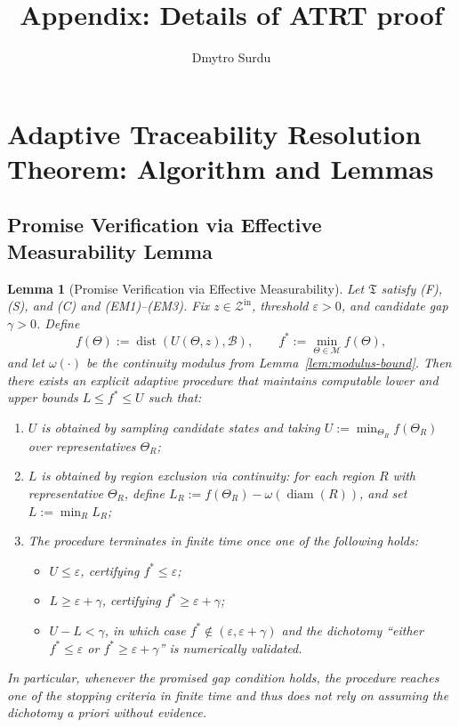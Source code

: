 \documentclass[12pt]{article}
\title{\textbf{Appendix: Details of ATRT proof}}
\author{Dmytro Surdu}
\theoremstyle{definition}
\theoremstyle{plain}
\newtheorem{lemma}{Lemma}[section]
\begin{document}
\maketitle

\section{Adaptive Traceability Resolution Theorem: Algorithm and Lemmas}

\subsection{Promise Verification via Effective Measurability Lemma}

\begin{lemma}[Promise Verification via Effective Measurability]
\label{lem:promise-verification}
Let \(\mathfrak T\) satisfy (F), (S), and (C) and (EM1)--(EM3). Fix \(z\in\mathcal Z^{\mathrm{in}}\), threshold \(\varepsilon>0\), and candidate gap \(\gamma>0\). Define
\[
f(\Theta):=\operatorname{dist}(U(\Theta,z),\mathcal B),\qquad
f^*:=\min_{\Theta\in\mathcal M} f(\Theta),
\]
and let \(\omega(\cdot)\) be the continuity modulus from Lemma~\ref{lem:modulus-bound}. Then there exists an explicit adaptive procedure that maintains computable lower and upper bounds \(L\le f^*\le U\) such that:
\begin{enumerate}
  \item \(U\) is obtained by sampling candidate states and taking \(U := \min_{\Theta_R} f(\Theta_R)\) over representatives \(\Theta_R\);
  \item \(L\) is obtained by region exclusion via continuity: for each region \(R\) with representative \(\Theta_R\), define \(L_R := f(\Theta_R) - \omega(\operatorname{diam}(R))\), and set \(L := \min_R L_R\);
  \item The procedure terminates in finite time once one of the following holds:
    \begin{itemize}
      \item \(U\le\varepsilon\), certifying \(f^*\le\varepsilon\);
      \item \(L\ge\varepsilon+\gamma\), certifying \(f^*\ge\varepsilon+\gamma\);
      \item \(U-L<\gamma\), in which case \(f^*\notin (\varepsilon,\varepsilon+\gamma)\) and the dichotomy ``either \(f^*\le\varepsilon\) or \(f^*\ge\varepsilon+\gamma\)'' is numerically validated.
    \end{itemize}
\end{enumerate}
In particular, whenever the promised gap condition holds, the procedure reaches one of the stopping criteria in finite time and thus does not rely on assuming the dichotomy a priori without evidence.
\end{lemma}
\end{document}
